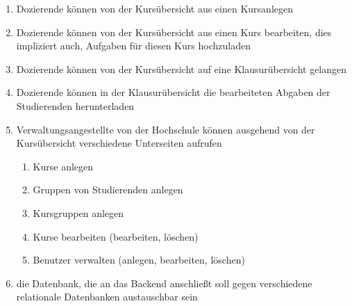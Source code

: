 \begin{enumerate}
	\item \gls{Dozierende} können von der Kursübersicht aus einen \gls{Kurs}anlegen
	\item \gls{Dozierende} können von der Kursübersicht aus einen \gls{Kurs} bearbeiten, dies impliziert auch, \gls{Aufgabe}n für diesen \gls{Kurs} hochzuladen
	\item \gls{Dozierende} können von der Kursübersicht auf eine Klausurübersicht gelangen
	\item \gls{Dozierende} können in der Klausurübersicht die bearbeiteten Abgaben der \gls{Studierende}n herunterladen
	\item \gls{Verwaltungsangestellte} von der Hochschule können ausgehend von der Kursübersicht verschiedene Unterseiten aufrufen
	\begin{enumerate}
		\item \gls{Kurs}e anlegen
	 	\item Gruppen von Studierenden anlegen
		\item Kursgruppen anlegen
		\item \gls{Kurs}e bearbeiten (bearbeiten, löschen)
		\item Benutzer verwalten (anlegen, bearbeiten, löschen)
	\end{enumerate}	 
	\item die Datenbank, die an das Backend anschließt soll gegen verschiedene \gls{relationale Datenbank}en austauschbar sein
\end{enumerate}